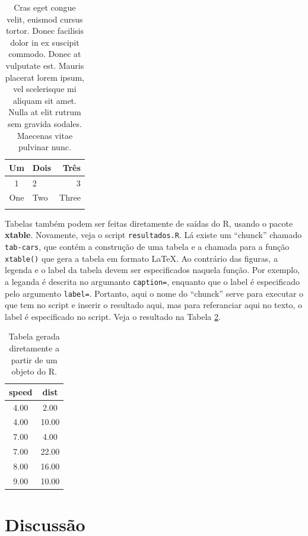 \documentclass[book,A4paper,10pt,twoside,oldfontcommands]{memoir}\usepackage[]{graphicx}\usepackage[usenames,dvipsnames]{color}
\begin{document}
\begin{table}
\centering
\caption{Cras eget congue velit, euismod cursus tortor. Donec
  facilisis dolor in ex suscipit commodo. Donec at vulputate est.
  Mauris placerat lorem ipsum, vel scelerisque mi aliquam sit amet.
  Nulla at elit rutrum sem gravida sodales. Maecenas vitae pulvinar
  nunc.}
\begin{tabular}{clr}
\hline
Um & Dois & Três\\
\hline
1 & 2 & 3 \\
One & Two & Three\\
\hline
\label{Tab:result}
\end{tabular}
\end{table}

Tabelas também podem ser feitas diretamente de saídas do R, usando o
pacote \textbf{xtable}. Novamente, veja o script \texttt{resultados.R}.
Lá existe um ``chunck'' chamado \texttt{tab-cars}, que contém a
construção de uma tabela e a chamada para a função \texttt{xtable()} que
gera a tabela em formato \LaTeX. Ao contrário das figuras, a legenda e o
label da tabela devem ser especificados naquela função. Por exemplo, a
leganda é descrita no argumanto \texttt{caption=}, enquanto que o label
é especificado pelo argumento \texttt{label=}. Portanto, aqui o nome do
``chunck'' serve para executar o que tem no script e inserir o resultado
aqui, mas para referanciar aqui no texto, o label é especificado no
script. Veja o resultado na Tabela \ref{tab:res}.

\begin{table}[!htb]
\centering
\caption{Tabela gerada diretamente a partir de um objeto do R.} 
\label{tab:res}
\begin{tabular}{cc}
  \hline
speed & dist \\ 
  \hline
4.00 & 2.00 \\ 
  4.00 & 10.00 \\ 
  7.00 & 4.00 \\ 
  7.00 & 22.00 \\ 
  8.00 & 16.00 \\ 
  9.00 & 10.00 \\ 
   \hline
\end{tabular}
\end{table}



\chapter{Discussão}
\end{document}
